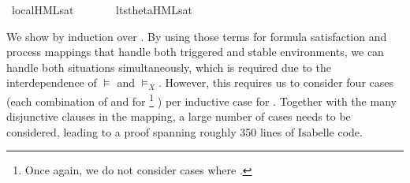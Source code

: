 \begin{isabellebody}
%
\endisatagproof
{\isafoldproof}%
%
\isadelimproof
%
\endisadelimproof
\isanewline
{}\isamarkupfalse%
\ local{\isachardot}{\kern0pt}HML{\isacharunderscore}{\kern0pt}sat\ {\isacharparenleft}{\kern0pt}{\isachardoublequoteopen}{\isacharunderscore}{\kern0pt}\ {\isasymTurnstile}\ {\isacharunderscore}{\kern0pt}{\isachardoublequoteclose}\ {\isacharbrackleft}{\kern0pt}{}{}{\isacharcomma}{\kern0pt}\ {}{}{\isacharbrackright}{\kern0pt}\ {}{}{\isacharparenright}{\kern0pt}\isanewline
{}\isamarkupfalse%
\ lts{\isacharunderscore}{\kern0pt}theta{\isachardot}{\kern0pt}HML{\isacharunderscore}{\kern0pt}sat\ {\isacharparenleft}{\kern0pt}{\isachardoublequoteopen}{\isacharunderscore}{\kern0pt}\ {\isasymTurnstile}\ {\isacharunderscore}{\kern0pt}{\isachardoublequoteclose}\ {\isacharbrackleft}{\kern0pt}{}{}{\isacharcomma}{\kern0pt}\ {}{}{\isacharbrackright}{\kern0pt}\ {}{}{\isacharparenright}{\kern0pt}%
\begin{isamarkuptext}%
We show  by induction over \isa{{\isasymphi}}. By using those terms for formula satisfaction and process mappings that handle both triggered and stable environments, we can handle both situations simultaneously, which is required due to the interdependence of $\vDash$ and $\vDash_X$. However, this requires us to consider four cases (each combination of  and  for %
\footnote{Once again, we do not consider cases where .}%
) per inductive case for \isa{{\isasymphi}}. Together with the many disjunctive clauses in the mapping, a large number of cases needs to be considered, leading to a proof spanning roughly 350 lines of Isabelle code.%

\end{isamarkuptext}
\end{isabellebody}
